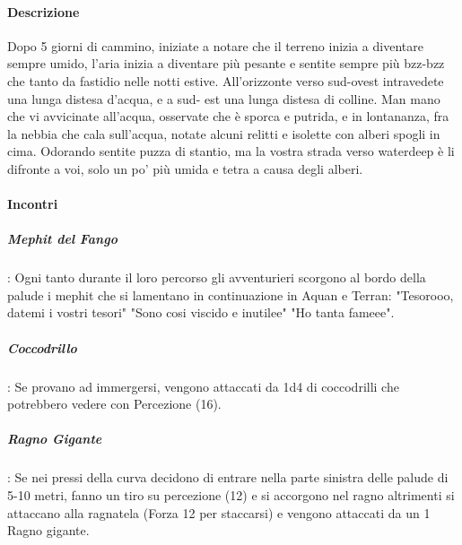 \documentclass{article}
\begin{document}
                \paragraph{	Descrizione } Dopo 5 giorni di cammino, iniziate a notare che il terreno inizia a diventare sempre umido, l'aria inizia a diventare più pesante e sentite sempre più bzz-bzz che tanto da fastidio nelle notti estive. All'orizzonte verso sud-ovest intravedete una lunga distesa d'acqua, e a sud- est una lunga distesa di colline. Man mano che vi avvicinate all'acqua, osservate che è sporca e putrida, e in lontananza, fra la nebbia che cala sull'acqua, notate alcuni relitti e isolette con alberi spogli in cima. Odorando  sentite puzza di stantio, ma la vostra strada verso waterdeep è li difronte a voi, solo un po' più umida e tetra a causa degli alberi. 

                \paragraph{Incontri}

                        \subparagraph{Mephit del Fango}: Ogni tanto durante il loro percorso gli avventurieri scorgono al bordo della palude i mephit che si lamentano in continuazione in Aquan e Terran:  "Tesorooo, datemi i vostri tesori" "Sono cosi viscido e inutilee" "Ho tanta fameee".

                        \subparagraph{Coccodrillo}: Se provano ad immergersi, vengono attaccati da 1d4 di coccodrilli che potrebbero vedere con Percezione (16).

                        \subparagraph{Ragno Gigante}: Se nei pressi della curva decidono di entrare nella parte sinistra delle palude di 5-10 metri, fanno un tiro su percezione (12) e si accorgono nel ragno altrimenti si attaccano alla ragnatela (Forza 12 per staccarsi) e vengono attaccati da un 1 Ragno gigante. 
\end{document}
